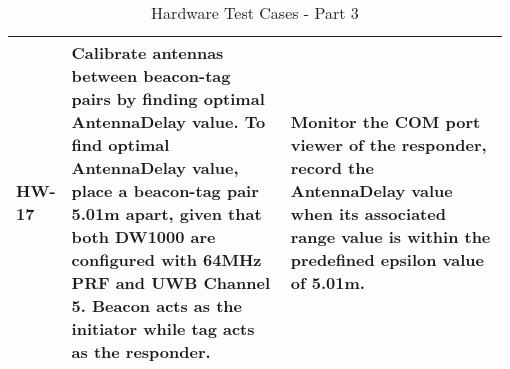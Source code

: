 \begin{table}[h!]
\begin{tabular}{|p{0.075\linewidth}|p{0.45\linewidth}|p{0.45\linewidth}|}
	\hline
	HW-17
	& Calibrate antennas between beacon-tag pairs by finding optimal AntennaDelay value. To find optimal AntennaDelay value, place a beacon-tag pair 5.01m apart, given that both DW1000 are configured with 64MHz PRF and UWB Channel 5. Beacon acts as the initiator while tag acts as the responder.
	& Monitor the COM port viewer of the responder, record the AntennaDelay value when its associated range value is within the predefined epsilon value of 5.01m. \\
	
    \hline
    \end{tabular}
    \caption{Hardware Test Cases - Part 3}
\end{table}

	
	
	


